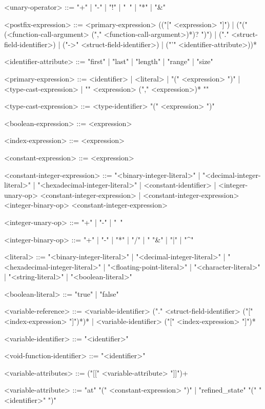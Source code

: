 \documentclass[11pt,letterpaper,twoside,openany]{book}
\begin{document}
\begin{grammar}
<unary-operator> ::= "+" | "-" | "!" | "~" | "*" | "&"

<postfix-expression> ::=
   <primary-expression>
      (("[" <expression> "]") |
       ("(" (<function-call-argument> ("," <function-call-argument>)*)? ")") |
       ("." <struct-field-identifier>) |
       ("->" <struct-field-identifier>) |
       ("'" <identifier-attribute>))*

<identifier-attribute> ::= "first" | "last" | "length" | "range" | "size"

<primary-expression> ::=
   <identifier> |
   <literal> |
   "(" <expression> ")" |
   <type-cast-expression> |
   "{" <expression> ("," <expression>)* "}"

<type-cast-expression> ::= <type-identifier> "(" <expression> ")"

<boolean-expression> ::= <expression>

<index-expression> ::= <expression>

<constant-expression> ::= <expression>

<constant-integer-expression> ::=
   "<binary-integer-literal>" |
   "<decimal-integer-literal>" |
   "<hexadecimal-integer-literal>" |
   <constant-identifier> |
   <integer-unary-op> <constant-integer-expression> |
   <constant-integer-expression> <integer-binary-op>
      <constant-integer-expression>

<integer-unary-op> ::= "+" | "-" | "~"

<integer-binary-op> ::=
   "+" | "-" | "*" | "/" | "%
   "&" | "|" | "^"

<literal> ::=
   "<binary-integer-literal>" |
   "<decimal-integer-literal>" |
   "<hexadecimal-integer-literal>" |
   "<floating-point-literal>" |
   "<character-literal>" |
   "<string-literal>" |
   "<boolean-literal>"

<boolean-literal> ::= "true" | "false"

<variable-reference> ::=
  <variable-identifier> ("." <struct-field-identifier> ("[" <index-expression> "]")*)* |
  <variable-identifier> ("[" <index-expression> "]")*

<variable-identifier> ::= "<identifier>"

<void-function-identifier> ::= "<identifier>"

<variable-attributes> ::=
   ("[[" <variable-attribute> "]]")+

<variable-attribute> ::=
   "at" "(" <constant-expression> ")" |
   "refined_state" "(" "<identifier>" ")"


\end{grammar}
\end{document}
